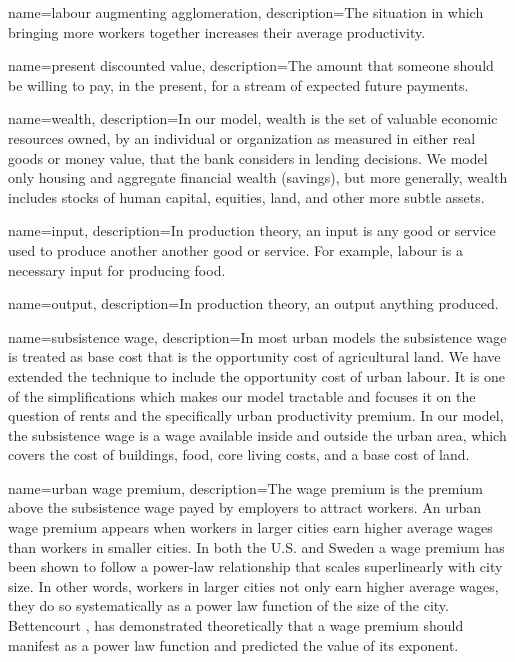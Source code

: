 {
name=labour augmenting agglomeration,
description={The situation in which bringing more workers together increases their average productivity.}
}

{
name=present discounted value,
description={The amount that someone should be willing to pay, in the present, for a stream of expected future payments.}
}

{
name=wealth,
description={In our model, wealth is the set of valuable economic resources owned, by an individual or organization as measured in either real goods or money value, that the bank considers in lending decisions. We model only housing and aggregate financial wealth (savings), but more generally, wealth includes stocks of human capital, equities, land, and other more subtle assets.}
}

{
name=input,
description={In production theory, an input is any good or service used to produce another another good or service. %
For example, labour is a necessary input for producing food. }
}

{
name=output,
description={In production theory, an output anything produced.} %
}

{
name=subsistence wage,
description={In most urban models the subsistence wage is treated as base cost that is the opportunity cost of agricultural land. We have extended the technique to include the opportunity cost of urban labour. It is one of the simplifications which makes our model tractable and focuses it on the question of rents and the specifically urban productivity premium. In our model, the subsistence wage is a wage available inside and outside the urban area, which covers the cost of buildings, food, core living costs, and a base cost of land.}
}

{
name=urban wage premium,
description={The wage premium is the premium above the \gls{subsistence wage} payed by employers to attract workers. An urban wage premium appears when workers in larger cities earn higher average wages than workers in smaller cities. In both the U.S. and Sweden a wage premium has been shown to follow a power-law relationship that scales superlinearly with city size. In other words, workers in larger cities not only earn higher average wages, they do so systematically as a power law function of the size of the city. Bettencourt  \cite{bettencourtIntroductionUrbanScience2021}, has demonstrated theoretically that a wage premium should manifest as a power law function and predicted the value of its exponent.}
}

